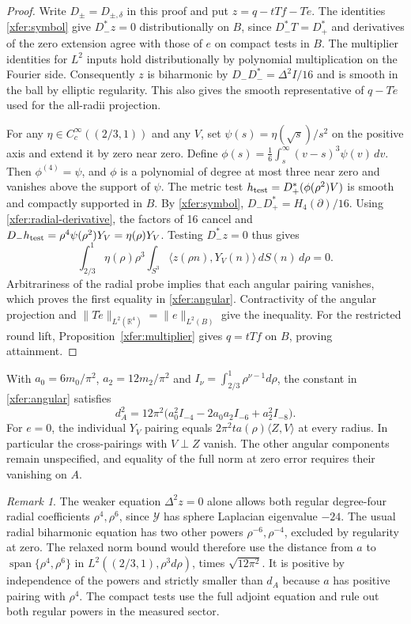 \documentclass[11pt]{article}
\numberwithin{equation}{section}
\theoremstyle{definition}
\theoremstyle{remark}
\newtheorem{remark}[theorem]{Remark}
\begin{document}
\begin{proof}
Write \(D_\pm=D_{\pm,\delta}\) in this proof and put
\(z=q-tTf-T\widetilde e\).
The identities \eqref{xfer:symbol} give \(D_-^*z=0\)
distributionally on \(B\), since \(D_-^*T=D_+^*\) and
derivatives of the zero extension agree with those of \(e\) on
compact tests in \(B\). The multiplier identities for \(L^2\) inputs
hold distributionally by polynomial multiplication on the Fourier
side. Consequently \(z\) is biharmonic by
\(D_-D_-^*=\Delta^2 I/16\) and is smooth in the ball by
elliptic regularity. This also gives the smooth representative
of \(q-T\widetilde e\) used for the all-radii projection.

For any \(\eta\in C_c^\infty((2/3,1))\) and any \(V\), set
\(\psi(s)=\eta(\sqrt{s})/s^2\) on the positive axis and extend
it by zero near zero. Define
\(\phi(s)=\tfrac16\int_s^\infty(v-s)^3\psi(v)\,dv\).
Then \(\phi^{(4)}=\psi\), and \(\phi\) is a polynomial of
degree at most three near zero and vanishes above the support of \(\psi\).
The metric test \(h_{\rm test}=D_+^*(\phi(\rho^2)V)\) is smooth
and compactly supported in \(B\). By \eqref{xfer:symbol},
\(D_-D_+^*=H_4(\partial)/16\). Using
\eqref{xfer:radial-derivative}, the factors of 16 cancel and
\(D_-h_{\rm test}=\rho^4\psi(\rho^2)Y_V=\eta(\rho)Y_V\).
Testing \(D_-^*z=0\) thus gives
\[
 \int_{2/3}^1 \eta(\rho)\rho^3
        \int_{S^3}\langle z(\rho n),Y_V(n)\rangle\,dS(n)\,d\rho=0 .
\]
Arbitrariness of the radial probe implies that each angular pairing
vanishes, which proves the first equality in \eqref{xfer:angular}.
Contractivity of the angular projection and
\(\|T\widetilde e\|_{L^2(\mathbb R^4)}=\|e\|_{L^2(B)}\) give the inequality.
For the restricted round lift, Proposition~\ref{xfer:multiplier}
gives \(q=tTf\) on \(B\), proving attainment.
\end{proof}

With \(a_0=6m_0/\pi^2\), \(a_2=12m_2/\pi^2\) and
\(I_\nu=\int_{2/3}^1\rho^{\nu-1}d\rho\), the constant in
\eqref{xfer:angular} satisfies
\[
 d_A^2=12\pi^2\bigl(a_0^2I_{-4}-2a_0a_2I_{-6}+a_2^2I_{-8}\bigr).
\]
For \(e=0\), the individual \(Y_V\) pairing equals
\(2\pi^2t a(\rho)\langle Z,V\rangle\) at every radius.
In particular the cross-pairings with \(V\perp Z\) vanish.
The other angular components remain unspecified, and equality
of the full norm at zero error requires their vanishing on \(A\).

\begin{remark}\label{xfer:relaxed}
The weaker equation \(\Delta^2 z=0\) alone allows both regular
degree-four radial coefficients \(\rho^4,\rho^6\), since
\(\mathcal Y\) has sphere Laplacian eigenvalue \(-24\). The usual
radial biharmonic equation has two other powers \(\rho^{-6},\rho^{-4}\),
excluded by regularity at zero. The relaxed norm bound would therefore
use the distance from \(a\) to
\(\operatorname{span}\{\rho^4,\rho^6\}\) in
\(L^2((2/3,1),\rho^3d\rho)\), times \(\sqrt{12\pi^2}\).
It is positive by independence of the powers and strictly smaller
than \(d_A\) because \(a\) has positive pairing with \(\rho^4\).
The compact tests use the full adjoint equation and rule out
both regular powers in the measured sector.
\end{remark}
\end{document}
